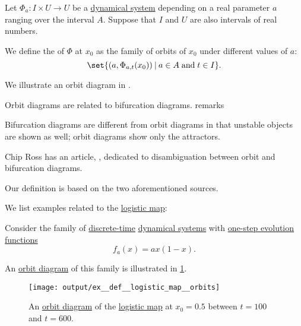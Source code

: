 \begin{definition}\label{def:orbit_diagram}\mimprovised
  Let \( \Phi_a: I \times U \to U \) be a \hyperref[def:dynamical_system]{dynamical system} depending on a real parameter \( a \) ranging over the interval \( A \). Suppose that \( I \) and \( U \) are also intervals of real numbers.

  We define the  of \( \Phi \) at \( x_0 \) as the family of orbits of \( x_0 \) under different values of \( a \):
  \begin{equation}\label{eq:def:orbit_diagram}
    \set{ (a, \Phi_{a,t}(x_0)) \given a \in A \T{and} t \in I }.
  \end{equation}
\end{definition}
\begin{comments}
  \item We illustrate an orbit diagram in .

  \item Orbit diagrams are related to bifurcation diagrams.  remarks
  \begin{displayquote}
    Bifurcation diagrams are different from orbit diagrams in that unstable objects are shown as well; orbit diagrams show only the attractors.
  \end{displayquote}

  Chip Ross has an article, \cite{Ross2004BifurcationAndOrbitDiagrams}, dedicated to disambiguation between orbit and bifurcation diagrams.

  Our definition is based on the two aforementioned sources.
\end{comments}

\begin{example}\label{ex:def:logistic_map}
  We list examples related to the \hyperref[def:logistic_map]{logistic map}:
  \begin{thmenum}
     Consider the family of \hyperref[def:discrete_dynamical_system]{discrete-time} \hyperref[def:dynamical_system]{dynamical systems} with \hyperref[def:one_step_evolution_function]{one-step evolution functions}
    \begin{equation*}
      f_a(x) = a x (1 - x).
    \end{equation*}

    An \hyperref[def:orbit_diagram]{orbit diagram} of this family is illustrated in \cref{fig:ex:def:logistic_map/orbits}.

    \begin{figure}[!ht]
      \centering
      \texttt{[image: output/ex\_\_def\_\_logistic\_map\_\_orbits]}
      \caption{An \hyperref[def:orbit_diagram]{orbit diagram} of the \hyperref[def:logistic_map]{logistic map} at \( x_0 = 0.5 \) between \( t = 100 \) and \( t = 600 \).}\label{fig:ex:def:logistic_map/orbits}
    \end{figure}
  \end{thmenum}
\end{example}

